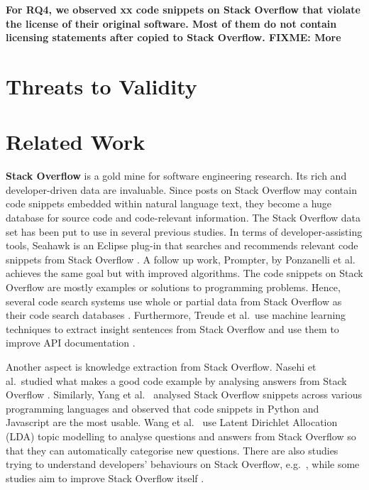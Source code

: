 \documentclass[sigconf,review, anonymous]{acmart}
\newcommand\FIXME[1]{\textbf{FIXME: #1}}
\begin{document}
\textbf{For RQ4, we observed xx code snippets on Stack Overflow that violate the license of their original software. Most of them do not contain licensing statements after copied to Stack Overflow. \FIXME{More}}

\section{Threats to Validity}

\section{Related Work}

\textbf{Stack Overflow} is a gold mine for software engineering research. Its rich and developer-driven data are invaluable. Since posts on Stack Overflow may contain code snippets embedded within natural language text, they become a huge database for source code and code-relevant information. The Stack Overflow data set has been put to use in several previous studies. In terms of developer-assisting tools, Seahawk is an Eclipse plug-in that searches and recommends relevant code snippets from Stack Overflow \cite{Ponzanelli2013}. A follow up work, Prompter, by Ponzanelli et al.~\cite{Ponzanelli2014} achieves the same goal but with improved algorithms. The code snippets on Stack Overflow are mostly examples or solutions to programming problems. Hence, several code search systems use whole or partial data from Stack Overflow as their code search databases \cite{Diamantopoulos2015,Keivanloo2014,Park2014, Stolee2014,Subramanian2013,Diamantopoulos2015}. Furthermore, Treude et al.~use machine learning techniques to extract insight sentences from Stack Overflow and use them to improve API documentation \cite{Treude2016}.

Another aspect is knowledge extraction from Stack Overflow. Nasehi et al.~studied what makes a good code example by analysing answers from Stack Overflow \cite{Nasehi2012}. Similarly, Yang et al.~\cite{Yang2016} analysed Stack Overflow snippets across various programming languages and observed that code snippets in Python and Javascript are the most usable. Wang et al.~\cite{Wang2013_StackOverflow} use Latent Dirichlet Allocation (LDA) topic modelling to analyse questions and answers from Stack Overflow so that they can automatically categorise new questions. There are also studies trying to understand developers' behaviours on Stack Overflow, e.g.~\cite{Movshovitz-Attias2013,Rosen2016,Choetkiertikul2015,Bosu2013}, while some studies aim to improve Stack Overflow itself \cite{Diamantopoulos2015, Wang2014}. 
\end{document}
